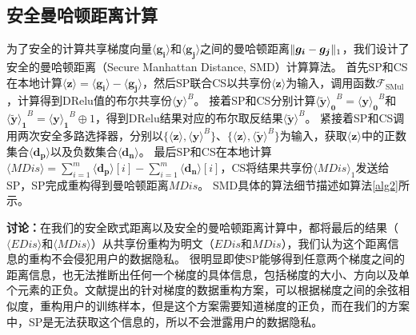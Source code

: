 \subsection{安全曼哈顿距离计算}\label{smd}
为了安全的计算共享梯度向量$\boldsymbol{\langle g_i\rangle}$和$\boldsymbol{\langle g_j\rangle}$之间的曼哈顿距离$\Vert \boldsymbol{g_i} - \boldsymbol{g_j}\Vert_1$，我们设计了安全的曼哈顿距离（Secure Manhattan Distance, SMD）计算算法。
首先SP和CS在本地计算$\boldsymbol{\langle z\rangle} = \boldsymbol{\langle g_i\rangle} - \boldsymbol{\langle g_j\rangle}$，然后SP联合CS以共享份$\boldsymbol{\langle z\rangle}$为输入，调用函数$\mathcal{F}_{\text {SMul}}$，计算得到DRelu值的布尔共享份$\boldsymbol{\langle y\rangle}^{B}$。
接着SP和CS分别计算$\boldsymbol{\langle \widetilde{y} \rangle_0}^{B} = \boldsymbol{\langle y\rangle_0}^{B}$和$\boldsymbol{\langle \widetilde{y} \rangle_1}^{B} = \boldsymbol{\langle y\rangle_1}^{B} \oplus 1$，得到DRelu结果对应的布尔取反结果$\boldsymbol{\langle \widetilde{y} \rangle}^{B}$。
紧接着SP和CS调用两次安全多路选择器，分别以$\{\boldsymbol{\langle z\rangle}, \boldsymbol{\langle y\rangle}^{B}\}$、$\{\boldsymbol{\langle z\rangle}, \boldsymbol{\langle \widetilde{y}\rangle}^{B}\}$为输入，获取$\boldsymbol{\langle z\rangle}$中的正数集合$\boldsymbol{
	\langle d_p\rangle}$以及负数集合$\boldsymbol{
	\langle d_n\rangle}$。
最后SP和CS在本地计算$\langle \textit{MDis}\rangle = \sum_{i=1}^{m}\boldsymbol{\langle d_p\rangle}[i] - \sum_{i=1}^{m}\boldsymbol{\langle d_n\rangle}[i]$，CS将结果共享份$\langle \textit{MDis}\rangle_1$发送给SP，SP完成重构得到曼哈顿距离$\textit{MDis}$。
SMD具体的算法细节描述如算法\ref{alg2}所示。

\textbf{讨论：}在我们的安全欧式距离以及安全的曼哈顿距离计算中，都将最后的结果（$\langle \textit{EDis}\rangle$和$\langle \textit{MDis}\rangle$）从共享份重构为明文（$\textit{EDis}$和$\textit{MDis}$），我们认为这个距离信息的重构不会侵犯用户的数据隐私。
很明显即使SP能够得到任意两个梯度之间的距离信息，也无法推断出任何一个梯度的具体信息，包括梯度的大小、方向以及单个元素的正负。文献\cite{geiping2020inverting}提出的针对梯度的数据重构方案，可以根据梯度之间的余弦相似度，重构用户的训练样本，但是这个方案需要知道梯度的正负，而在我们的方案中，SP是无法获取这个信息的，所以不会泄露用户的数据隐私。

